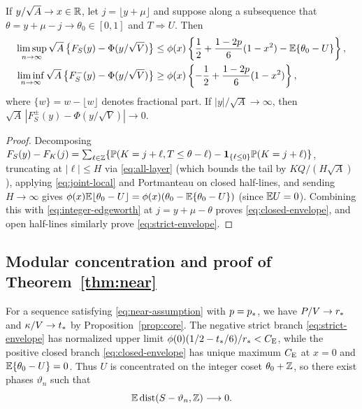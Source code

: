 \begin{lemma}\label{lem:endpoints}
If $y/\sqrt A\to x\in\mathbb R$, let $j=\lfloor y+\mu\rfloor$ and suppose along a
subsequence that $\theta=y+\mu-j\to\theta_0\in[0,1]$ and $T\Rightarrow U$.
Then
\begin{align}
 \limsup_{n\to\infty}\sqrt A\,\bigl\{F_S(y)-\Phi(y/\sqrt V)\bigr\}
 &\le\phi(x)\left\{\frac12+\frac{1-2p}{6}(1-x^2)
                         -\mathbb E\{\theta_0-U\}\right\},\label{eq:closed-envelope}\\
 \liminf_{n\to\infty}\sqrt A\,\bigl\{F_S^-(y)-\Phi(y/\sqrt V)\bigr\}
 &\ge\phi(x)\left\{-\frac12+\frac{1-2p}{6}(1-x^2)\right\},
                                                        \label{eq:strict-envelope}
\end{align}
where $\{w\}=w-\lfloor w\rfloor$ denotes fractional part. If
$|y|/\sqrt A\to\infty$, then $\sqrt A\,|F_S^\pm(y)-\Phi(y/\sqrt V)|\to0$.
\end{lemma}
\begin{proof}
Decomposing $F_S(y)-F_K(j)=\sum_{\ell\in\mathbb Z}\{\mathbb P(K=j+\ell,T\le\theta-\ell)-\mathbf1_{\{\ell\le0\}}\mathbb P(K=j+\ell)\}$,
truncating at $|\ell|\le H$ via \eqref{eq:all-layer} (which bounds the tail
by $KQ/(H\sqrt A)$), applying \eqref{eq:joint-local} and Portmanteau on closed
half-lines, and sending $H\to\infty$ gives
$\phi(x)\mathbb E\lfloor\theta_0-U\rfloor=\phi(x)(\theta_0-\mathbb E\{\theta_0-U\})$ (since
$\mathbb E U=0$). Combining this with \eqref{eq:integer-edgeworth} at $j=y+\mu-\theta$
proves \eqref{eq:closed-envelope}, and open half-lines similarly prove
\eqref{eq:strict-envelope}.
\end{proof}

\subsection{Modular concentration and proof of Theorem~\ref{thm:near}}

For a sequence satisfying \eqref{eq:near-assumption} with $p=p_*$, we have
$P/V\to r_*$ and $\kappa/V\to t_*$ by Proposition~\ref{prop:core}. The negative
strict branch \eqref{eq:strict-envelope} has normalized upper limit
$\phi(0)(1/2-t_*/6)/r_*<C_{\mathrm E}$, while the positive closed branch
\eqref{eq:closed-envelope} has unique maximum $C_{\mathrm E}$ at $x=0$ and
$\mathbb E\{\theta_0-U\}=0$. Thus $U$ is concentrated on the integer coset
$\theta_0+\mathbb Z$, so there exist phases $\vartheta_n$ such that
\begin{equation}\label{eq:modular}
              \mathbb E\operatorname{dist}(S-\vartheta_n,\mathbb Z)\longrightarrow0.
\end{equation}

